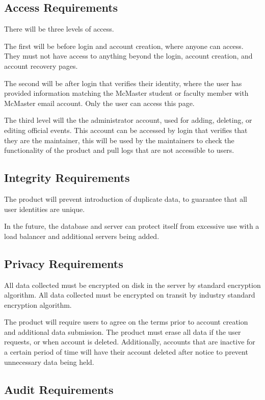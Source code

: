 \documentclass{article}
\begin{document}
\subsection{Access Requirements}

There will be three levels of access. 

The first will be before login and account creation, where anyone can access. They must not have access to anything beyond the login, account creation, and account recovery pages.

The second will be after login that verifies their identity, where the user has provided information matching the McMaster student or faculty member with McMaster email account. Only the user can access this page.

The third level will the the administrator account, used for adding, deleting, or editing official events. This account can be accessed by login that verifies that they are the maintainer, this will be used by the maintainers to check the functionality of the product  and pull logs that are not accessible to users.

\subsection{Integrity Requirements}

The product will prevent introduction of duplicate data, to guarantee that all user identities are unique.

In the future, the database and server can protect itself from excessive use with a load balancer and additional servers being added.

\subsection{Privacy Requirements}

All data collected must be encrypted on disk in the server by standard encryption algorithm.
All data collected must be encrypted on transit by industry standard encryption algorithm.

The product will require users to agree on the terms prior to account creation and additional data submission.
The product must erase all data if the user requests, or when account is deleted.
Additionally, accounts that are inactive for a certain period of time will have their account deleted after notice to prevent unnecessary data being held.

\subsection{Audit Requirements}
\end{document}
